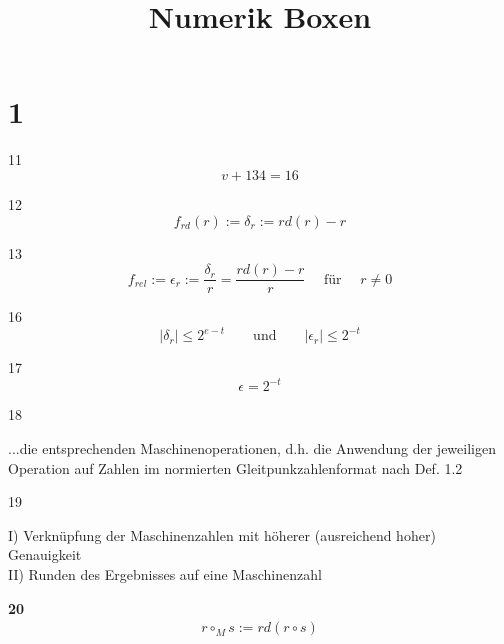 \documentclass[13pt]{scrreprt}
\title{Numerik Boxen}
\author{}
\newenvironment{ebox}[1]{\textbf{#1}\\}{}
\begin{document}
\maketitle

\begin{abstract}
\end{abstract}


\chapter{1}

11
\begin{equation*}
v + 134 = 16
\end{equation*}
	
12
\begin{equation*}
f_{rd}(r):= \delta_{r}:=rd(r)-r
\end{equation*}

13
\begin{equation*}
f_{rel}:=\epsilon_{r}:= \frac{\delta_{r}}{r}=\frac{rd(r) -r}{r} \quad\text{ für }\quad r \ne 0
\end{equation*}



16
\begin{equation*}
|\delta_{r}| \leqslant 2^{e-t} \qquad \text{und} \qquad  |\epsilon_{r}| \leqslant 2^{-t}
\end{equation*}

17
\begin{equation*}
\epsilon = 2^{-t}
\end{equation*}

18

...die entsprechenden Maschinenoperationen, d.h. die Anwendung der jeweiligen Operation auf Zahlen im normierten Gleitpunkzahlenformat nach Def. 1.2

19

I) Verknüpfung der Maschinenzahlen mit höherer (ausreichend hoher) Genauigkeit\\
II) Runden des Ergebnisses auf eine Maschinenzahl

\begin{ebox}{20}
	\begin{align*}
	r \circ _{M}s := rd(r \circ s)
	\end{align*}
\end{ebox}
\end{document}
